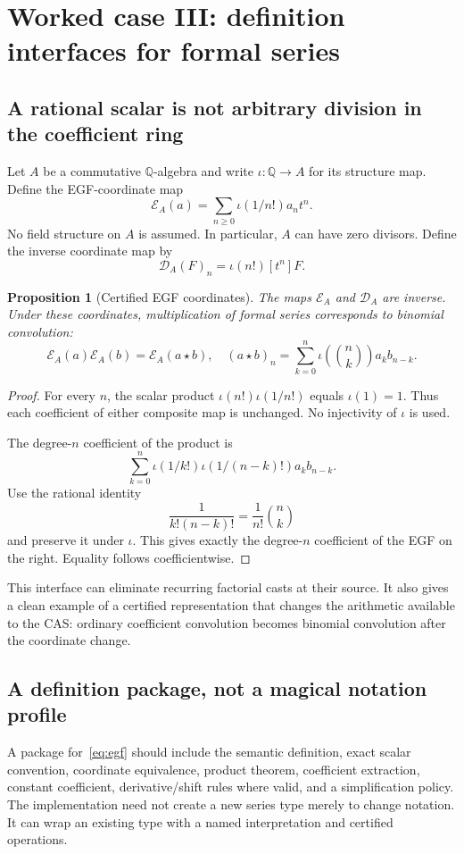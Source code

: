 \documentclass[11pt,a4paper]{article}
\newcommand{\Q}{\mathbb Q}
\newcommand{\coeff}[2]{[#1]#2}
\newtheorem{proposition}{Proposition}[section]
\theoremstyle{definition}
\theoremstyle{remark}
\begin{document}
\section{Worked case III: definition interfaces for formal series}\label{sec:egf}
\subsection{A rational scalar is not arbitrary division in the coefficient ring}
Let $A$ be a commutative $\Q$-algebra and write $\iota:\Q\to A$ for its structure map. Define the EGF-coordinate map
\begin{equation}\label{eq:egf}
\mathcal E_A(a)=\sum_{n\ge0}\iota(1/n!)a_n t^n.
\end{equation}
No field structure on $A$ is assumed. In particular, $A$ can have zero divisors. Define the inverse coordinate map by
\[
\mathcal D_A(F)_n=\iota(n!)\coeff{t^n}{F}.
\]

\begin{proposition}[Certified EGF coordinates]\label{prop:egf}
The maps $\mathcal E_A$ and $\mathcal D_A$ are inverse. Under these coordinates, multiplication of formal series corresponds to binomial convolution:
\[
\mathcal E_A(a)\mathcal E_A(b)=\mathcal E_A(a\star b),
\quad
(a\star b)_n=\sum_{k=0}^{n}\iota\!\left(\binom nk\right)a_kb_{n-k}.
\]
\end{proposition}
\begin{proof}
For every $n$, the scalar product $\iota(n!)\iota(1/n!)$ equals $\iota(1)=1$. Thus each coefficient of either composite map is unchanged. No injectivity of $\iota$ is used.

The degree-$n$ coefficient of the product is
\[
\sum_{k=0}^{n}\iota(1/k!)\iota(1/(n-k)!)a_kb_{n-k}.
\]
Use the rational identity
\[
\frac{1}{k!(n-k)!}=\frac{1}{n!}\binom nk
\]
and preserve it under $\iota$. This gives exactly the degree-$n$ coefficient of the EGF on the right. Equality follows coefficientwise.
\end{proof}
This interface can eliminate recurring factorial casts at their source. It also gives a clean example of a certified representation that changes the arithmetic available to the CAS: ordinary coefficient convolution becomes binomial convolution after the coordinate change.

\subsection{A definition package, not a magical notation profile}
A package for~\eqref{eq:egf} should include the semantic definition, exact scalar convention, coordinate equivalence, product theorem, coefficient extraction, constant coefficient, derivative/shift rules where valid, and a simplification policy. The implementation need not create a new series type merely to change notation. It can wrap an existing type with a named interpretation and certified operations.
\end{document}
